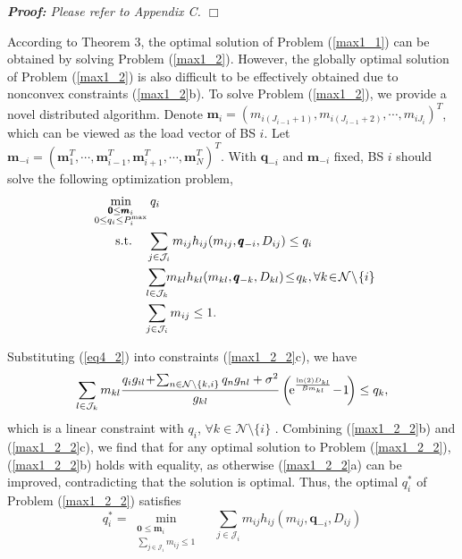 \documentclass[journal]{IEEEtran}
\begin{document}
\itshape \textbf{Proof:}  \upshape Please refer to Appendix C. \hfill $\Box$

According to Theorem 3, the optimal solution of Problem (\ref{max1_1}) can be obtained by solving Problem (\ref{max1_2}).
However, the globally optimal solution of Problem (\ref{max1_2}) is also difficult to be effectively obtained due to nonconvex constraints (\ref{max1_2}b).
To solve Problem (\ref{max1_2}), we provide a novel distributed algorithm.
Denote $\pmb{m}_i=(m_{i (J_{i-1}+1)}, m_{i (J_{i-1}+2)}, \cdots, m_{i J_{i}})^T$, which can be viewed as the load vector of BS $i$.
Let $\pmb m_{-i}=(\pmb m_1^T, \cdots, \pmb m_{i-1}^T, \pmb m_{i+1}^T, \cdots, \pmb m_N^T)^T$.
With $\pmb q_{-i}$ and $\pmb m_{-i}$ fixed, BS $i$ should solve the following optimization problem,
\begin{subequations}\label{max1_2_2}
\begin{align}
\!\!\!\mathop{\min}_
{\substack{
\pmb{0} \leq \pmb{m}_i\\
{0} \leq  {q}_i \leq {P}^{\max}_i
}
}
\:
& q_i
\\
\textrm{s.t.}\quad\:\:
&\!\! \sum_{j \in {\cal{J}}_i }m_{ij} h_{ij}(m_{ij},\pmb{q}_{-i}, D_{ij})\leq q_i
\\
&\!\!\!  \sum_{l \in {\cal{J}}_k } \!\!m_{kl} h_{kl}(m_{kl},\pmb{q}_{-k}, D_{kl})\!\leq\! q_k, \forall k\!\in\! {\cal{N}}\!\setminus \!\{i\}\!\!\!\!\!
\\
&\!\!\! \sum_{j \in {\cal{J}}_i } m_{ij} \leq 1.
\end{align}
\end{subequations}

Substituting (\ref{eq4_2}) into constraints (\ref{max1_2_2}c), we have
\begin{equation*}\label{eq4_3}
\sum_{l \in {\cal{J}}_k } m_{kl}\frac{q_i g_{il}\!+\!\sum_{n \in {\cal{N}}\setminus \{k,i\}}  q_n g_{nl} +\sigma ^2}
{g_{kl}}
\left(\!\text  e^{\frac {\ln(2)D_{kl}}{B m_{kl}} }\!-\!1
\!\right)
\leq q_k,
\end{equation*}
which is a linear constraint with $q_i$, $\forall k \in \mathcal N\setminus \{i\}$ .
Combining (\ref{max1_2_2}b) and (\ref{max1_2_2}c), we find that for any optimal solution to Problem (\ref{max1_2_2}),
(\ref{max1_2_2}b) holds with equality, as otherwise (\ref{max1_2_2}a) can be improved, contradicting that the solution is optimal.
Thus, the optimal $q_i^*$ of Problem (\ref{max1_2_2}) satisfies
\begin{equation}\label{eq4_4}
q_i^* =\mathop{\min}\limits_{\substack{\pmb 0 \leq\pmb{m}_i\\
\sum_{j \in \mathcal J_i}m_{ij}\leq 1}}
\quad
\sum_{j \in \mathcal J_i}m_{ij} h_{ij}(m_{ij},\pmb{q}_{-i}, D_{ij})
\end{equation}
\end{document}
